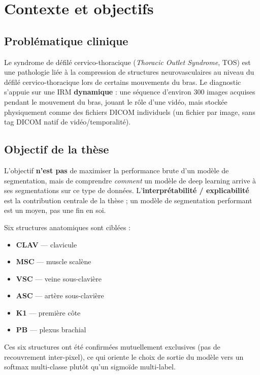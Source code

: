\chapter{Contexte et objectifs}
\label{chap:contexte}

\section{Problématique clinique}

Le syndrome de défilé cervico-thoracique (\emph{Thoracic Outlet Syndrome}, TOS) est une pathologie
liée à la compression de structures neurovasculaires au niveau du défilé cervico-thoracique lors de
certains mouvements du bras. Le diagnostic s'appuie sur une IRM \textbf{dynamique} : une séquence
d'environ 300 images acquises pendant le mouvement du bras, jouant le rôle d'une vidéo, mais stockée
physiquement comme des fichiers DICOM individuels (un fichier par image, sans tag DICOM natif de
vidéo/temporalité).

\section{Objectif de la thèse}

L'objectif \textbf{n'est pas} de maximiser la performance brute d'un modèle de segmentation, mais de
comprendre \emph{comment} un modèle de deep learning arrive à ses segmentations sur ce type de données.
L'\textbf{interprétabilité / explicabilité} est la contribution centrale de la thèse ; un modèle de
segmentation performant est un moyen, pas une fin en soi.

Six structures anatomiques sont ciblées :

\begin{itemize}[nosep]
    \item \textbf{CLAV} --- clavicule
    \item \textbf{MSC} --- muscle scalène
    \item \textbf{VSC} --- veine sous-clavière
    \item \textbf{ASC} --- artère sous-clavière
    \item \textbf{K1} --- première côte
    \item \textbf{PB} --- plexus brachial
\end{itemize}

Ces six structures ont été confirmées mutuellement exclusives (pas de recouvrement inter-pixel), ce
qui oriente le choix de sortie du modèle vers un softmax multi-classe plutôt qu'un sigmoïde
multi-label.

